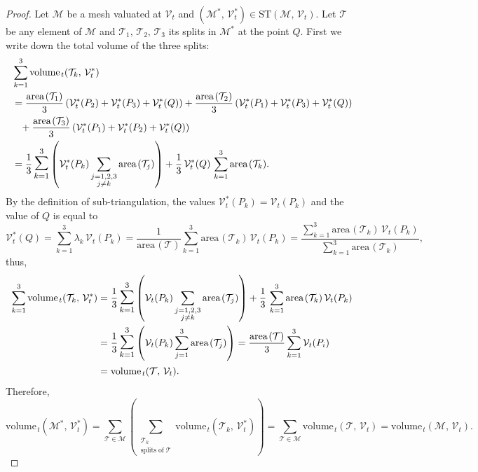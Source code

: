 \documentclass{article}
\theoremstyle{definition}
\newcommand{\MM}{\mathcal{M}}
\newcommand{\VV}{\mathcal{V}}
\newcommand{\TT}{\mathcal{T}}
\newcommand{\area}{\mathrm{area}\hspace{1pt}}
\newcommand{\vol}{\mathrm{volume\hspace{1pt}}}
\newcommand{\ST}{\mathrm{ST}}
\begin{document}
\begin{proof}[Proof]
Let $\MM$ be a mesh valuated at $\VV_t$ and $(\MM^*,\,\VV_t^*) \in \ST(\MM,\,\VV_t)$. Let $\TT$ be any element of $\MM$ and $\TT_1,\,\TT_2,\,\TT_3$ its splits in $\MM^*$ at the point $Q$.
First we write down the total volume of the three splits:
\begin{align*}
& \sum_{k=1}^3\vol_t(\TT_k,\,\VV_t^*)\\ & =
   \frac{\area(\TT_1)}{3}\left(\VV_t^*(P_2)+ \VV_t^*(P_3) + \VV_t^*(Q)
\right)
 +  \frac{\area(\TT_2)}{3}\left(\VV_t^*(P_1) + \VV_t^*(P_3)+ \VV_t^*(Q)
\right)\\ &
\hspace{8pt} +  \frac{\area(\TT_3)}{3}\left(\VV_t^*(P_1)+ \VV_t^*(P_2) + \VV_t^*(Q)
\right) \\ & = 
\frac{1}{3}\,\mathlarger{\mathlarger{\sum}}_{k=1}^3\left(\VV_t^*(P_k)\sum_{\substack{j=1,2,3 \\ j\neq k}}\area(\TT_j)\right) + \frac{1}{3}\,\VV_t^*(Q)\,\sum_{k=1}^3\area(\TT_k).
\end{align*}
By the definition of sub-triangulation, the values $\VV_t^*(P_k) = \VV_t(P_k)$ and the value of $Q$ is equal to \[\VV_t^*(Q) = \sum_{k=1}^3\lambda_k\,\VV_t(P_k) = \frac{1}{\area(\TT)}\sum_{k=1}^3\area(\TT_k)\,\VV_t(P_k) 
=  \frac{\sum_{k=1}^3\area(\TT_k)\,\VV_t(P_k)}{\sum_{k=1}^3\area(\TT_k)},\]
thus,
\begin{align*}\sum_{k=1}^3\vol_t(\TT_k,\,\VV_t^*) & = 
\frac{1}{3}\,\mathlarger{\mathlarger{\sum}}_{k=1}^3\left(\VV_t(P_k)\sum_{\substack{j=1,2,3 \\ j\neq k}}\area(\TT_j)\right)
+ \frac{1}{3}\,\sum_{k=1}^3\area(\TT_k)\,\VV_t(P_k)
\\ & = \frac{1}{3}\,\mathlarger{\mathlarger{\sum}}_{k=1}^3\left(\VV_t(P_k)\sum_{j=1}^3\area(\TT_j)\right)
= \frac{\area(\TT)}{3} \sum_{k=1}^3 \VV_t(P_i) \\ & = \vol_t(\TT,\,\VV_t) .
\end{align*}
Therefore,
\[\vol_t(\MM^*,\,\VV_t^*) = \sum_{\TT\in\MM}\left(\sum_{\substack{\TT_k\\ \mathrm{splits\;of\;} \TT}} \vol_t(\TT_k,\,\VV_t^*)\right) = \sum_{\TT\in\MM} \vol_t(\TT,\,\VV_t) = \vol_t(\MM,\,\VV_t).\]
\end{proof}
\end{document}
